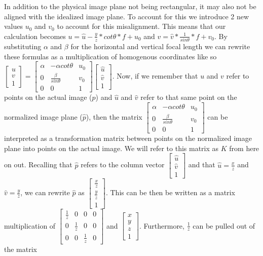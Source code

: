 In addition to the physical image plane not being rectangular, it may also not be aligned with the idealized image plane.  To
account for this we introduce 2 new values $u_0$ and $v_0$ to account for this misalignment.  This means that our 
calculation becomes $u=\hat{u}-\frac{y}{z} * cot \theta * f + u_0$ and $v=\hat{v} * \frac{1}{sin \theta} * f + 
v_0$. By substituting $\alpha$ and $\beta$ for the horizontal and vertical focal length we can rewrite these formulas as a 
multiplication of homogenous coordinates like so $\begin{bmatrix} u \\ v \\ 1 \end{bmatrix} = \begin{bmatrix} \alpha & -\alpha 
cot\theta & u_{0} \\ 0 & \frac{\beta}{sin\theta} & v_{0} \\ 0 & 0 & 1 \end{bmatrix} \begin{bmatrix}\hat{u} \\ \hat{v}\\ 
1\end{bmatrix}$.  
Now, if we remember that $u$ and $v$ refer to points on the actual image ($p$) and $\hat{u}$ and $\hat{v}$ refer to that same point 
on the normalized image plane ($\hat{p}$), then the matrix $\begin{bmatrix} \alpha & -\alpha cot\theta & u_0 \\ 0 & \frac{\beta}
{sin\theta} & v_0 \\ 0 & 0 & 1 \end{bmatrix}$ can be interpreted as a transformation matrix between points on the normalized image 
plane into points on the actual image.  We will refer to this matrix as $K$ from here on out.  Recalling that $\hat{p}$ refers to 
the column vector $\begin{bmatrix} \hat{u} \\ \hat{v} \\ 1 \end{bmatrix}$ and that $\hat{u} = \frac{x}{z}$ and $\hat{v} = \frac{y}
{z}$, we can rewrite $\hat{p}$ as $\begin{bmatrix} \frac{x}{z} \\ \frac{y}{z} \\ 1 \end{bmatrix}$.  This can be then be written as 
a matrix multiplication of $\begin{bmatrix} \frac{1}{z} & 0 & 0 & 0 \\ 0 & \frac{1}{z} & 0 & 0 \\ 0 & 0 & \frac{1}{z} & 0 
\end{bmatrix}$ and $\begin{bmatrix} x \\ y \\ z \\ 1 \end{bmatrix}$.  Furthermore, $\frac{1}{z}$ can be pulled out of the matrix 
